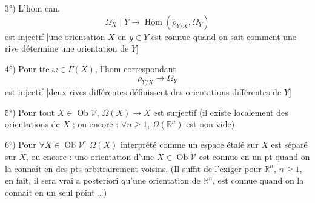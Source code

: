 \documentclass[11pt,a4paper]{article}
\begin{document}

3°) L'hom can.
\[
  \Omega_{X} \mid Y \longrightarrow \underline{\operatorname{Hom}}(\rho_{Y/X}, \Omega_{Y})
\]
est injectif [une orientation  $X$ en $y \in Y$ est connue quand on sait comment  une rive  \struck{\ill{}} détermine une orientation de $Y$]

4°) Pour tte $\omega \in \Gamma(X)$, l'hom correspondant
\[
  \rho_{Y/X} \longrightarrow \Omega_{Y}
\]
est injectif [deux rives différentes définissent des orientations différentes de $Y$]

5°) Pour tout $X \in \operatorname{Ob} \mathcal{V}$, $\Omega(X) \to X$ est surjectif (il existe localement des orientations de $X$ ; ou encore : $\forall n \geq 1$, $\Omega(\mathbb{R}^{n})$ est non vide)

6°) Pour $\forall X \in \operatorname{Ob} \mathcal{V}$] $\Omega(X)$ interprété comme un espace étalé sur $X$ est séparé sur $X$, ou encore : une orientation d'une $X \in \operatorname{Ob} \mathcal{V}$ est connue en un pt quand on la connaît en des pts arbitrairement voisins. (Il suffit de l'exiger pour $\mathbb{R}^{n}$, $n \geq 1$, en fait, il sera vrai a posteriori qu'une orientation de $\mathbb{R}^{n}$,  est connue quand on la connaît en un seul point …)

\end{document}
